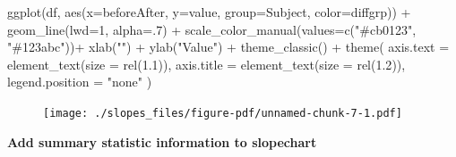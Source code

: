 \documentclass[
  letterpaper,
  DIV=11,
  numbers=noendperiod]{scrreprt}
\newenvironment{Shaded}{\begin{snugshade}}{\end{snugshade}}
\newcommand{\AttributeTok}[1]{\textcolor[rgb]{0.40,0.45,0.13}{#1}}
\newcommand{\DecValTok}[1]{\textcolor[rgb]{0.68,0.00,0.00}{#1}}
\newcommand{\FloatTok}[1]{\textcolor[rgb]{0.68,0.00,0.00}{#1}}
\newcommand{\FunctionTok}[1]{\textcolor[rgb]{0.28,0.35,0.67}{#1}}
\newcommand{\NormalTok}[1]{\textcolor[rgb]{0.00,0.23,0.31}{#1}}
\newcommand{\OtherTok}[1]{\textcolor[rgb]{0.00,0.23,0.31}{#1}}
\newcommand{\SpecialCharTok}[1]{\textcolor[rgb]{0.37,0.37,0.37}{#1}}
\newcommand{\StringTok}[1]{\textcolor[rgb]{0.13,0.47,0.30}{#1}}
\begin{document}
\begin{Shaded}
\begin{Highlighting}[]
\FunctionTok{ggplot}\NormalTok{(df, }\FunctionTok{aes}\NormalTok{(}\AttributeTok{x=}\NormalTok{beforeAfter, }\AttributeTok{y=}\NormalTok{value, }\AttributeTok{group=}\NormalTok{Subject, }\AttributeTok{color=}\NormalTok{diffgrp)) }\SpecialCharTok{+}
  \FunctionTok{geom\_line}\NormalTok{(}\AttributeTok{lwd=}\DecValTok{1}\NormalTok{, }\AttributeTok{alpha=}\NormalTok{.}\DecValTok{7}\NormalTok{) }\SpecialCharTok{+}
  \FunctionTok{scale\_color\_manual}\NormalTok{(}\AttributeTok{values=}\FunctionTok{c}\NormalTok{(}\StringTok{"\#cb0123"}\NormalTok{, }\StringTok{"\#123abc"}\NormalTok{))}\SpecialCharTok{+}
  \FunctionTok{xlab}\NormalTok{(}\StringTok{""}\NormalTok{) }\SpecialCharTok{+}
  \FunctionTok{ylab}\NormalTok{(}\StringTok{"Value"}\NormalTok{) }\SpecialCharTok{+}
  \FunctionTok{theme\_classic}\NormalTok{() }\SpecialCharTok{+}
  \FunctionTok{theme}\NormalTok{(}
    \AttributeTok{axis.text =} \FunctionTok{element\_text}\NormalTok{(}\AttributeTok{size =} \FunctionTok{rel}\NormalTok{(}\FloatTok{1.1}\NormalTok{)),}
    \AttributeTok{axis.title =} \FunctionTok{element\_text}\NormalTok{(}\AttributeTok{size =} \FunctionTok{rel}\NormalTok{(}\FloatTok{1.2}\NormalTok{)),}
    \AttributeTok{legend.position =} \StringTok{"none"}
\NormalTok{  ) }
\end{Highlighting}
\end{Shaded}

\begin{figure}[H]

{\centering \texttt{[image: ./slopes\_files/figure-pdf/unnamed-chunk-7-1.pdf]}

}

\end{figure}

\textbf{Add summary statistic information to slopechart}

\begin{Shaded}
\end{Shaded}
\end{document}
